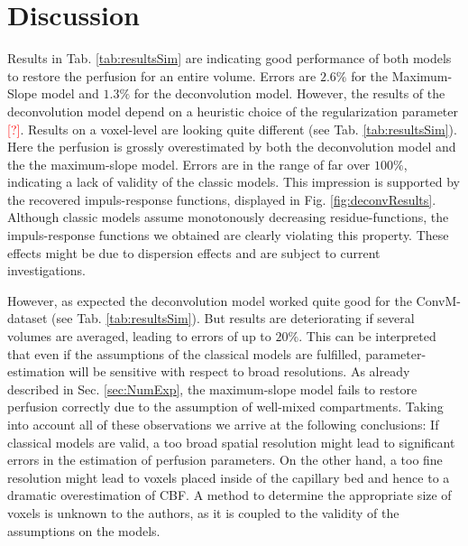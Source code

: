 \documentclass[paper=a4, fontsize=11pt,parskip=half,headings=small]{scrartcl}
\newcommand{\missingsource}{\textcolor{red}{[?]}}
\begin{document}
	\section{Discussion}\label{sec:conclusion}
	Results in Tab. \ref{tab:resultsSim} are indicating good performance of both models to restore the perfusion for an entire volume. 
	Errors are $2.6\%$ for the Maximum-Slope model and $1.3\%$ for the deconvolution model.
	However, the results of the deconvolution model depend on a heuristic choice of the regularization parameter \missingsource.
	Results on a voxel-level are looking quite different (see Tab. \ref{tab:resultsSim}).
	Here the perfusion is grossly overestimated by both the deconvolution model and the the maximum-slope model.
	Errors are in the range of far over $100\%$, indicating a lack of validity of the classic models.
	This impression is supported by the recovered impuls-response functions, displayed in Fig. \ref{fig:deconvResults}.
	Although classic models assume monotonously decreasing residue-functions, the impuls-response functions we obtained are clearly violating this property.
	These effects might be due to dispersion effects \cite{calamante03} and are subject to current investigations.
	
	However, as expected the deconvolution model worked quite good for the ConvM-dataset (see Tab. \ref{tab:resultsSim}). 
	But results are deteriorating if several volumes are averaged, leading to errors of up to $20\%$.
	This can be interpreted that even if the assumptions of the classical models are fulfilled, parameter-estimation will be sensitive with respect to broad resolutions.
	As already described in Sec. \ref{sec:NumExp}, the maximum-slope model fails to restore perfusion correctly due to the assumption of well-mixed compartments.
	Taking into account all of these observations we arrive at the following conclusions:
	If classical models are valid, a too broad spatial resolution might lead to significant errors in the estimation of perfusion parameters.
	On the other hand, a too fine resolution might lead to voxels placed inside of the capillary bed and hence to a dramatic overestimation of CBF.
	A method to determine the appropriate size of voxels is unknown to the authors, as it is coupled to the validity of the assumptions on the models.
	
\end{document}
